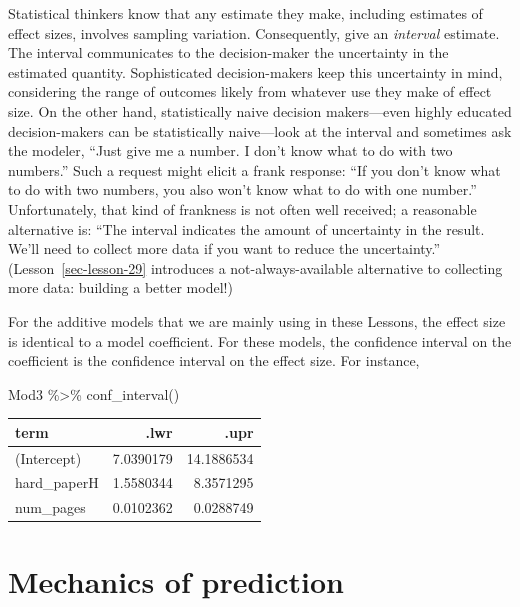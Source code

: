 \documentclass[
  letterpaper,
  DIV=11,
  numbers=noendperiod,
  oneside]{scrreprt}
\newenvironment{Shaded}{\begin{snugshade}}{\end{snugshade}}
\newcommand{\FunctionTok}[1]{\textcolor[rgb]{0.28,0.35,0.67}{#1}}
\newcommand{\NormalTok}[1]{\textcolor[rgb]{0.00,0.23,0.31}{#1}}
\newcommand{\SpecialCharTok}[1]{\textcolor[rgb]{0.37,0.37,0.37}{#1}}
\begin{document}
Statistical thinkers know that any estimate they make, including
estimates of effect sizes, involves sampling variation. Consequently,
give an \emph{interval} estimate. The interval communicates to the
decision-maker the uncertainty in the estimated quantity. Sophisticated
decision-makers keep this uncertainty in mind, considering the range of
outcomes likely from whatever use they make of effect size. On the other
hand, statistically naive decision makers---even highly educated
decision-makers can be statistically naive---look at the interval and
sometimes ask the modeler, ``Just give me a number. I don't know what to
do with two numbers.'' Such a request might elicit a frank response:
``If you don't know what to do with two numbers, you also won't know
what to do with one number.'' Unfortunately, that kind of frankness is
not often well received; a reasonable alternative is: ``The interval
indicates the amount of uncertainty in the result. We'll need to collect
more data if you want to reduce the uncertainty.''
(Lesson~\ref{sec-lesson-29} introduces a not-always-available
alternative to collecting more data: building a better model!)

For the additive models that we are mainly using in these Lessons, the
effect size is identical to a model coefficient. For these models, the
confidence interval on the coefficient is the confidence interval on the
effect size. For instance,

\begin{Shaded}
\begin{Highlighting}[]
\NormalTok{Mod3 }\SpecialCharTok{\%\textgreater{}\%} \FunctionTok{conf\_interval}\NormalTok{()}
\end{Highlighting}
\end{Shaded}

\ttfamily 
\begin{tabular}{lrr}
\toprule
term & .lwr & .upr\\
\midrule
(Intercept) & 7.0390179 & 14.1886534\\
hard\_paperH & 1.5580344 & 8.3571295\\
num\_pages & 0.0102362 & 0.0288749\\
\bottomrule
\end{tabular} \normalfont
\bigskip

\hypertarget{sec-lesson-25}{%
\chapter{Mechanics of prediction}\label{sec-lesson-25}}
\end{document}
